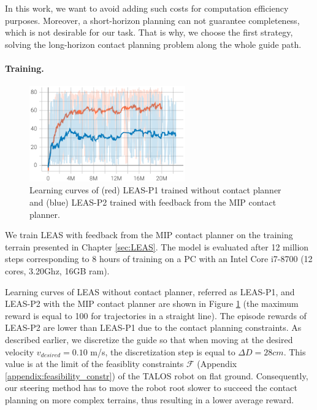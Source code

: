 In this work, we want to avoid adding such costs for computation efficiency purposes. 
Moreover, a short-horizon planning can not guarantee completeness, which is not desirable for our task.
That is why, we choose the first strategy, solving the long-horizon contact planning problem along the whole guide path.



\paragraph{Training.}
\begin{figure}[t]
    \centering
    \includegraphics[trim={0 0 0 0},clip,width=0.6\textwidth]{Figures/Chapter_MIP_SL1M/learning_curve_MIP_P1.png}
    \caption{Learning curves of (red) LEAS-P1 trained without contact planner and (blue) LEAS-P2 trained with feedback from the MIP contact planner.}
    \label{fig:mip:learning_curves}
\end{figure}
We train LEAS with feedback from the MIP contact planner on the training terrain presented in Chapter \ref{sec:LEAS}.
The model is evaluated after 12 million steps corresponding to 8 hours of training on a PC with an Intel Core i7-8700 (12 cores, 3.20Ghz, 16GB ram). 

Learning curves of LEAS without contact planner, referred as LEAS-P1, and LEAS-P2 with the MIP contact planner are shown in Figure \ref{fig:mip:learning_curves} (the maximum reward is equal to 100 for trajectories in a straight line).
The episode rewards of LEAS-P2 are lower than LEAS-P1 due to the contact planning constraints. 
As described earlier, we discretize the guide so that when moving at the desired velocity $v_{desired}=0.10$ m/s, the discretization step is equal to $\Delta D=28cm$. 
This value is at the limit of the feasiblity constraints $\mathcal{F}$ (Appendix \ref{appendix:feasibility_constr}) of the TALOS robot on flat ground. 
Consequently, our steering method has to move the robot root slower to succeed the contact planning on more complex terrains, thus resulting in a lower average reward.



